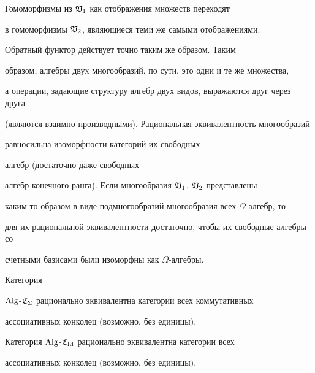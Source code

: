 Гомоморфизмы из ${\frak V}_1$ как отображения множеств переходят


в гомоморфизмы ${\frak V}_2$, являющиеся теми же самыми отображениями.


Обратный функтор действует точно таким же образом. Таким 


образом, алгебры двух многообразий, по сути, это одни и те же множества,


а операции, задающие структуру алгебр двух видов, выражаются друг через друга


(являются взаимно производными). Рациональная эквивалентность многообразий


равносильна изоморфности категорий их свободных


алгебр (достаточно даже свободных


алгебр конечного ранга). Если многообразия $\frak V_1$, $\frak V_2$ представлены


каким-то образом в виде подмногообразий многообразия всех $\Omega$-алгебр, то


для их рациональной эквивалентности достаточно, чтобы их свободные алгебры со


счетными базисами были изоморфны как $\Omega$-алгебры.












\begin{lemnonum}


Категория


$\operatorname{Alg}$-$\frak C_{\Sigma}$ рационально эквивалентна категории всех коммутативных


ассоциативных конколец $($возможно, без единицы$)$.


Категория $\operatorname{Alg}$-$\frak C_{\operatorname{Id}}$ рационально эквивалентна категории всех


ассоциативных конколец $($возможно, без единицы$)$.


\end{lemnonum}





